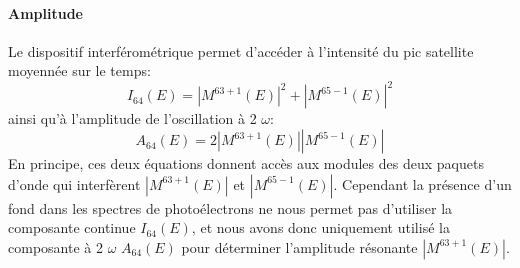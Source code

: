 \paragraph*{Amplitude} Le dispositif interférométrique permet d'accéder à l'intensité du pic satellite moyennée sur le temps: 
\begin{equation}
I_{64}(E) = \left| M^{63+1}(E)\right|^2 + \left| M^{65-1}(E)\right|^2
\label{eq:I}
\end{equation}
ainsi qu'à l'amplitude de l'oscillation à 2 $\omega$:
\begin{equation}
A_{64}(E) = 2 \left| M^{63+1}(E)\right| \left| M^{65-1}(E)\right|
\label{eq:A}
\end{equation}
En principe, ces deux équations donnent accès aux modules des deux paquets d'onde qui interfèrent $\left| M^{63+1}(E)\right|$ et $\left| M^{65-1}(E)\right|$. Cependant la présence d'un fond dans les spectres de photoélectrons ne nous permet pas d'utiliser la composante continue $I_{64}(E)$, et nous avons donc uniquement utilisé la composante à 2 $\omega$ $A_{64}(E)$ pour déterminer l'amplitude résonante $\left| M^{63+1}(E)\right|$.

